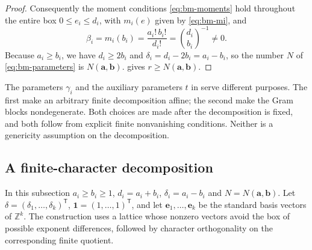 \begin{proof}
Consequently the moment conditions \eqref{eq:bm-moments} hold
throughout the entire box $0\le e_i\le d_i$, with $m_i(e)$ given by
\eqref{eq:bm-mi}, and
\[
\beta_i=m_i(b_i)=\frac{a_i!\,b_i!}{d_i!}
=\binom{d_i}{b_i}^{-1}\ne0 .
\]
Because $a_i\ge b_i$, we have $d_i\ge2b_i$ and
$\delta_i=d_i-2b_i=a_i-b_i$, so the number $N$ of
\eqref{eq:bm-parameters} is $N(\mathbf a,\mathbf b)$.
 gives $r\ge N(\mathbf a,\mathbf b)$.
\end{proof}

The parameters $\gamma_i$ and the auxiliary parameters $t$ in
 serve different purposes. The first make an arbitrary
finite decomposition affine; the second make the Gram blocks
nondegenerate. Both choices are made after the decomposition is fixed,
and both follow from explicit finite nonvanishing conditions. Neither
is a genericity assumption on the decomposition.

\subsection{A finite-character decomposition}
In this subsection $a_i\ge b_i\ge1$, $d_i=a_i+b_i$,
$\delta_i=a_i-b_i$ and $N=N(\mathbf a,\mathbf b)$. Let
$\delta=(\delta_1,\ldots,\delta_k)^{\mathsf T}$,
$\mathbf 1=(1,\ldots,1)^{\mathsf T}$, and let
$\mathbf e_1,\ldots,\mathbf e_k$ be the standard basis vectors of
$\mathbb Z^k$. The construction uses a lattice whose nonzero vectors
avoid the box of possible exponent differences, followed by character
orthogonality on the corresponding finite quotient.

